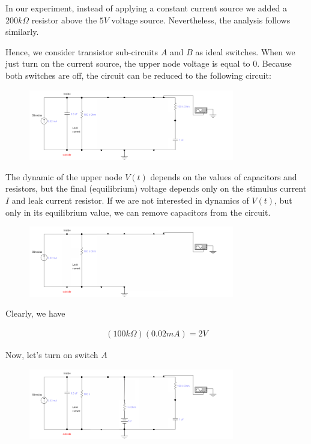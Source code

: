 \documentclass[12]{book}
\newcommand\0{\mathbf{0}}
\newcommand\<{\langle}
\renewcommand\>{\rangle}
\begin{document}
In our experiment, instead of applying a constant current source we added a $200k\Omega$ resistor above the $5V$ voltage source. Nevertheless, the analysis follows similarly.

Hence, we consider transistor sub-circuits $A$ and $B$ as ideal switches. When we just turn on the current source, the upper node voltage is equal to 0. Because both switches are off, the circuit can be reduced to the following circuit:
 
\begin{figure}[H]
\centering
\includegraphics[width=0.8\textwidth]{exercise1-1}
\end{figure}

The dynamic of the upper node $V(t)$ depends on the values of capacitors and resistors, but the final (equilibrium) voltage depends only on the stimulus current $I$ and leak current resistor. If we are not interested in dynamics of $V(t)$, but only in its equilibrium value, we can remove capacitors from the circuit.
 
\begin{figure}[H]
\centering
\includegraphics[width=0.8\textwidth]{exercise1-2}
\end{figure}

Clearly, we have

\begin{align*}
(100k\Omega)(0.02 mA) = 	2V
\end{align*}


Now, let's turn on switch $A$
 
 \begin{figure}[H]
 \centering
\includegraphics[width=0.8\textwidth]{exercise1-3}
\end{figure}
\end{document}
